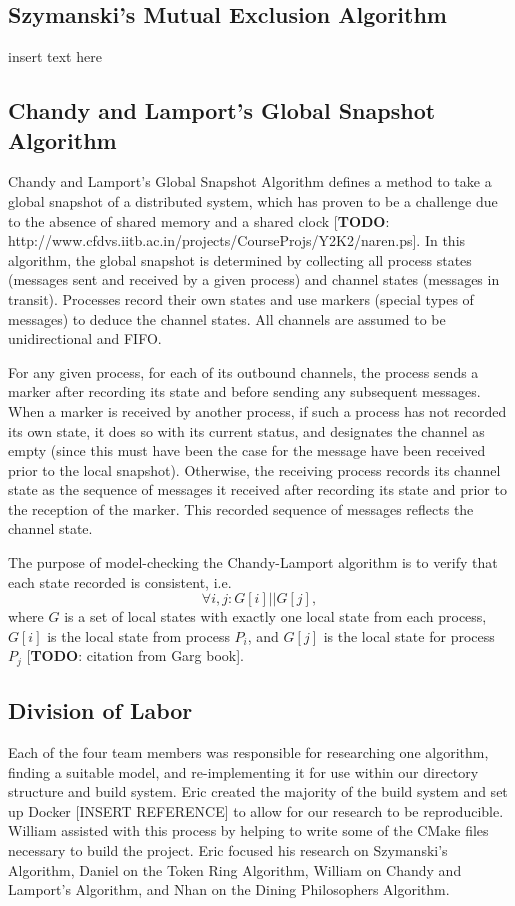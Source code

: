 \documentclass[12pt]{article}
\begin{document}
\begin{flushleft}
\subsection{Szymanski's Mutual Exclusion Algorithm}
insert text here
\subsection{Chandy and Lamport's Global Snapshot Algorithm}
Chandy and Lamport's Global Snapshot Algorithm defines a method to take a global snapshot of a distributed system, which has proven to be a challenge due to the absence of shared memory and a shared clock [\textbf{TODO}: http://www.cfdvs.iitb.ac.in/projects/CourseProjs/Y2K2/naren.ps]. In this algorithm, the global snapshot is determined by collecting all process states (messages sent and received by a given process) and channel states (messages in transit). Processes record their own states and use markers (special types of messages) to deduce the channel states. All channels are assumed to be unidirectional and FIFO.

For any given process, for each of its outbound channels, the process sends a marker after recording its state and before sending any subsequent messages. When a marker is received by another process, if such a process has not recorded its own state, it does so with its current status, and designates the channel as empty (since this must have been the case for the message have been received prior to the local snapshot). Otherwise, the receiving process records its channel state as the sequence of messages it received after recording its state and prior to the reception of the marker. This recorded sequence of messages reflects the channel state.

The purpose of model-checking the Chandy-Lamport algorithm is to verify that each state recorded is consistent, i.e. $$\forall i,j:G[i]||G[j],$$ where $G$ is a set of local states with exactly one local state from each process, $G[i]$ is the local state from process $P_i$, and $G[j]$ is the local state for process $P_j$ [\textbf{TODO}: citation from Garg book].

\subsection{Division of Labor}
Each of the four team members was responsible for researching one algorithm, finding a suitable model, and re-implementing it for use within our directory structure and build system. Eric created the majority of the build system and set up Docker [INSERT REFERENCE] to allow for our research to be reproducible. William assisted with this process by helping to write some of the CMake files necessary to build the project. Eric focused his research on Szymanski's Algorithm, Daniel on the Token Ring Algorithm, William on Chandy and Lamport's Algorithm, and Nhan on the Dining Philosophers Algorithm.


\end{flushleft}
\end{document}

